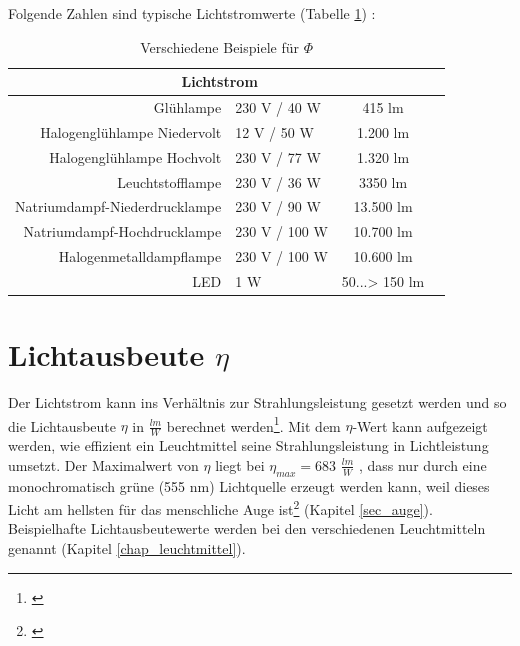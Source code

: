 
\noindent Folgende Zahlen sind typische Lichtstromwerte (Tabelle \ref{t_lumen}) :

\begin{table}[H] 
		\centering
		\begin{tabular}{rlcc}  %
		\toprule
		\multicolumn{3}{c}{\large\sffamily Lichtstrom}\\ 							
		\midrule
		Glühlampe & 230 V / 40 W & 415 lm\\ 
		Halogenglühlampe Niedervolt & 12 V / 50 W & 1.200 lm\\
		Halogenglühlampe Hochvolt & 230 V / 77 W & 1.320 lm\\
		Leuchtstofflampe & 230 V / 36 W & 3350 lm\\
		Natriumdampf-Niederdrucklampe & 230 V / 90 W & 13.500 lm\\
		Natriumdampf-Hochdrucklampe & 230 V / 100 W & 10.700 lm\\
		Halogenmetalldampflampe & 230 V / 100 W & 10.600 lm\\
		LED & 1 W & 50...> 150 lm\\
		\bottomrule
		\end{tabular}
		\caption{Verschiedene Beispiele für $\Phi$\protect\footnotemark}	
		\label{t_lumen}
	\end{table}
	
\section{Lichtausbeute $\eta$}
Der Lichtstrom kann ins Verhältnis zur Strahlungsleistung gesetzt werden und so die Lichtausbeute $\eta$ in $\frac{lm}{W}$ berechnet werden\footnote{\cite[35]{greule}}. Mit dem $\eta$-Wert kann aufgezeigt werden, wie effizient ein Leuchtmittel seine Strahlungsleistung in Lichtleistung umsetzt. Der Maximalwert von $\eta$ liegt bei $\eta_{max}=683$ $\frac{lm}{W}$ , dass nur durch eine monochromatisch grüne (555 nm) Lichtquelle erzeugt werden kann, weil dieses Licht am hellsten für das menschliche Auge ist\footnote{\cite[36]{greule}} (Kapitel \ref{sec_auge}).
Beispielhafte Lichtausbeutewerte werden bei den verschiedenen Leuchtmitteln genannt (Kapitel \ref{chap_leuchtmittel}).


